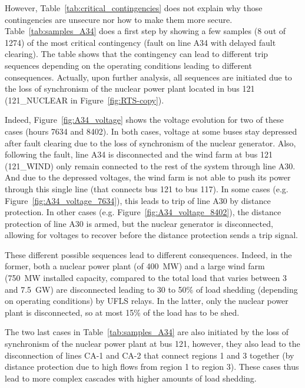 However, Table~\ref{tab:critical_contingencies} does not explain why those contingencies are unsecure nor how to make them more secure. Table~\ref{tab:samples_A34} does a first step by showing a few samples (8 out of 1274) of the most critical contingency (fault on line A34 with delayed fault clearing). The table shows that the contingency can lead to different trip sequences depending on the operating conditions leading to different consequences. Actually, upon further analysis, all sequences are initiated due to the loss of synchronism of the nuclear power plant located in bus 121 (121\_NUCLEAR in Figure~\ref{fig:RTS-copy}).

Indeed, Figure~\ref{fig:A34_voltage} shows the voltage evolution for two of these cases (hours 7634 and 8402). In both cases, voltage at some buses stay depressed after fault clearing due to the loss of synchronism of the nuclear generator. Also, following the fault, line A34 is disconnected and the wind farm at bus 121 (121\_WIND) only remain connected to the rest of the system through line A30. And due to the depressed voltages, the wind farm is not able to push its power through this single line (that connects bus 121 to bus 117). In some cases (e.g. Figure~\ref{fig:A34_voltage_7634}), this leads to trip of line A30 by distance protection. In other cases (e.g. Figure~\ref{fig:A34_voltage_8402}), the distance protection of line A30 is armed, but the nuclear generator is disconnected, allowing for voltages to recover before the distance protection sends a trip signal.

These different possible sequences lead to different consequences. Indeed, in the former, both a nuclear power plant (of 400~MW) and a large wind farm (750~MW installed capacity, compared to the total load that varies between 3 and 7.5~GW) are disconnected leading to 30 to 50\% of load shedding (depending on operating conditions) by UFLS relays. In the latter, only the nuclear power plant is disconnected, so at most 15\% of the load has to be shed.

The two last cases in Table~\ref{tab:samples_A34} are also initiated by the loss of synchronism of the nuclear power plant at bus 121, however, they also lead to the disconnection of lines CA-1 and CA-2 that connect regions 1 and 3 together (by distance protection due to high flows from region 1 to region 3). These cases thus lead to more complex cascades with higher amounts of load shedding.


